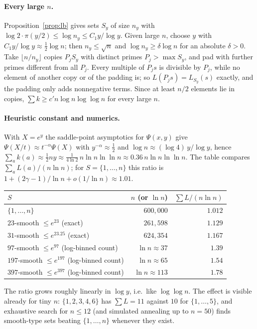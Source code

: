 \documentclass[11pt]{article}
\theoremstyle{remark}
\begin{document}
\paragraph{Every large $n$.}
Proposition~\ref{prop:lb} gives sets $S_y$ of size $n_y$ with $\log 2\cdot\pi(y/2)\le\log n_y\le C_1y/\log y$.
Given large $n$, choose $y$ with $C_1y/\log y\approx\frac12\log n$; then $n_y\le\sqrt n$ and $\log n_y\ge\delta\log n$ for an absolute $\delta>0$.
Take $\lfloor n/n_y\rfloor$ copies $P_jS_y$ with distinct primes $P_j>\max S_y$, and pad with further primes different from all $P_j$.
Every multiple of $P_js$ is divisible by $P_j$, while no element of another copy or of the padding is; so $L(P_js)=L_{S_y}(s)$ exactly, and the padding only adds nonnegative terms.
Since at least $n/2$ elements lie in copies, $\sum k\ge c'n\log n\log\log n$ for every large $n$.

\paragraph{Heuristic constant and numerics.}
With $X=e^{y}$ the saddle-point asymptotics for $\Psi(x,y)$ give $\Psi(X/t)\approx t^{-\alpha}\Psi(X)$ with $y^{-\alpha}\approx\tfrac12$ and $\log n\approx(\log 4)\,y/\log y$, hence $\sum_a k(a)\approx\tfrac12 ny\approx\frac{1}{4\ln 2}\,n\ln n\ln\ln n\approx 0.36\,n\ln n\ln\ln n$.
The table compares $\sum_a L(a)/(n\ln n)$; for $S=\{1,\dots,n\}$ this ratio is $1+(2\gamma-1)/\ln n+o(1/\ln n)\approx 1.01$.

\begin{center}
\begin{tabular}{lrr}
\toprule
$S$ & $n$ (or $\ln n$) & $\sum L/(n\ln n)$ \\
\midrule
$\{1,\dots,n\}$ & $600{,}000$ & $1.012$ \\
$23$-smooth $\le e^{23}$ (exact) & $261{,}598$ & $1.129$ \\
$31$-smooth $\le e^{23.25}$ (exact) & $624{,}354$ & $1.167$ \\
$97$-smooth $\le e^{97}$ (log-binned count) & $\ln n\approx 37$ & $1.39$ \\
$197$-smooth $\le e^{197}$ (log-binned count) & $\ln n\approx 65$ & $1.54$ \\
$397$-smooth $\le e^{397}$ (log-binned count) & $\ln n\approx 113$ & $1.78$ \\
\bottomrule
\end{tabular}
\end{center}
The ratio grows roughly linearly in $\log y$, i.e.\ like $\log\log n$.
The effect is visible already for tiny $n$: $\{1,2,3,4,6\}$ has $\sum L=11$ against $10$ for $\{1,\dots,5\}$, and exhaustive search for $n\le 12$ (and simulated annealing up to $n=50$) finds smooth-type sets beating $\{1,\dots,n\}$ whenever they exist.
\end{document}
